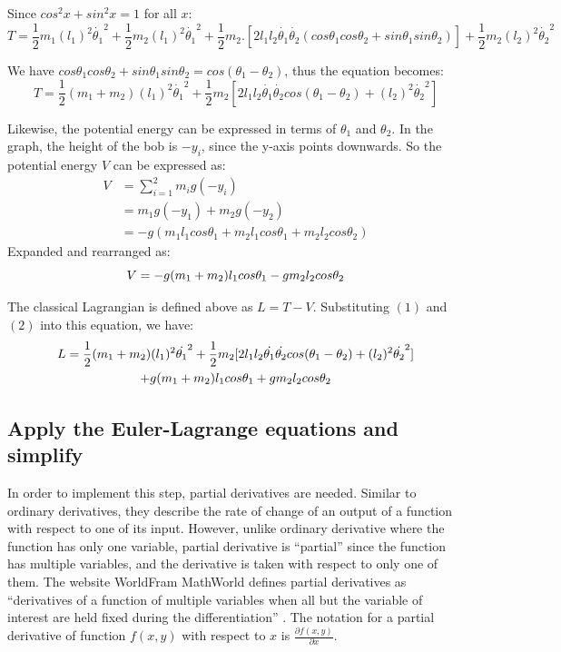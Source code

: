 \documentclass[a4paper,12pt]{article}
\begin{document}
Since $cos^2x+sin^2x=1$ for all $x$:
\[T =\frac{1}{2}m_1(l_1)^2\dot{\theta_1}^2
+\frac{1}{2}m_2(l_1)^2\dot{\theta_1}^2+\frac{1}{2}m_2.[2l_1l_2\dot{\theta_1}\dot{\theta_2}(cos\theta_1cos\theta_2+sin\theta_1sin\theta_2)]+\frac{1}{2}m_2(l_2)^2\dot{\theta_2}^2\]

We have $cos\theta_1cos\theta_2+sin\theta_1sin\theta_2=cos(\theta_1-\theta_2)$, thus the equation becomes:
\begin{equation}
    T=\frac{1}{2}(m_1+m_2)(l_1)^2\dot{\theta_1}^2+\frac{1}{2}m_2[2l_1l_2\dot{\theta_1}\dot{\theta_2}cos(\theta_1-\theta_2)+(l_2)^2\dot{\theta_2}^2]
\end{equation}

Likewise, the potential energy can be expressed in terms of $\theta_1$ and $\theta_2$. In the graph, the height of the bob is $-y_i$, since the y-axis points downwards. So the potential energy $V$ can be expressed as:
\begin{align*}
    V &= \sum_{i=1}^{2 }m_ig(-y_i)
    \\&= m_1g(-y_1) +m_2g(-y_2)
    \\&= -g(m_1l_1cos\theta_1 +m_2l_1cos\theta_1+m_2l_2cos\theta_2)
\end{align*}
Expanded and rearranged as:
\begin{equation}
    V   = -g(m_1+m_2)l_1cos\theta_1 \space - \space gm_2l_2cos\theta_2
\end{equation}

The classical Lagrangian is defined above as $L = T-V$. Substituting $(1)$ and $(2)$ into this equation, we have:
\begin{multline}
    L=\frac{1}{2}(m_1+m_2)(l_1)^2\dot{\theta_1}^2+\frac{1}{2}m_2[2l_1l_2\dot{\theta_1}\dot{\theta_2}cos(\theta_1-\theta_2)+(l_2)^2\dot{\theta_2}^2] \\
    +g(m_1+m_2)l_1cos\theta_1 \space + \space gm_2l_2cos\theta_2 
\end{multline}
\subsection{Apply the Euler-Lagrange equations and simplify}
In order to implement this step, partial derivatives are needed. Similar to ordinary derivatives, they describe the rate of change of an output of a function with respect to one of its input. However, unlike ordinary derivative where the function has only one variable, partial derivative is “partial” since the function has multiple variables, and the derivative is taken with respect to only one of them. The website WorldFram MathWorld defines partial derivatives as “derivatives of a function of multiple variables when all but the variable of interest are held fixed during the differentiation” \cite{partial-derivative}. The notation for a partial derivative of function $f(x,y)$ with respect to $x$ is $\frac{\partial f(x,y)}{\partial x}$.
\end{document}
